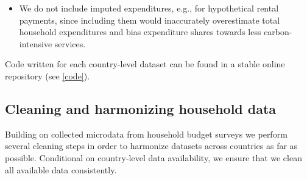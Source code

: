 \documentclass[12pt, a4paper]{article}
\begin{document}
\begin{refsection}
\begin{itemize}
    \item We do not include imputed expenditures, e.g., for hypothetical rental payments, since including them would inaccurately overestimate total household expenditures and bias expenditure shares towards less carbon-intensive services.
\end{itemize}

Code written for each country-level dataset can be found in a stable online repository (see \ref{code}).

\subsection{Cleaning and harmonizing household data}

Building on collected microdata from household budget surveys we perform several cleaning steps in order to harmonize datasets across countries as far as possible. Conditional on country-level data availability, we ensure that we clean all available data consistently. 


\end{refsection}
\end{document}
